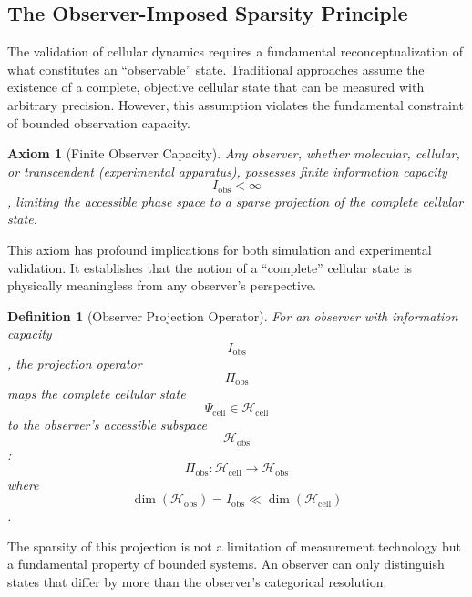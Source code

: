 \documentclass[11pt,twocolumn,a4paper]{article}
\newtheorem{definition}[theorem]{Definition}
\newtheorem{axiom}[theorem]{Axiom}
\theoremstyle{remark}
\begin{document}
\subsection{The Observer-Imposed Sparsity Principle}

The validation of cellular dynamics requires a fundamental reconceptualization of what constitutes an ``observable'' state. Traditional approaches assume the existence of a complete, objective cellular state that can be measured with arbitrary precision. However, this assumption violates the fundamental constraint of bounded observation capacity.

\begin{axiom}[Finite Observer Capacity]
\label{ax:finite_observer}
Any observer, whether molecular, cellular, or transcendent (experimental apparatus), possesses finite information capacity $$I_{\mathrm{obs}} < \infty$$, limiting the accessible phase space to a sparse projection of the complete cellular state.
\end{axiom}

This axiom has profound implications for both simulation and experimental validation. It establishes that the notion of a ``complete'' cellular state is physically meaningless from any observer's perspective.

\begin{definition}[Observer Projection Operator]
\label{def:observer_projection}
For an observer with information capacity $$I_{\mathrm{obs}}$$, the projection operator $$\Pi_{\mathrm{obs}}$$ maps the complete cellular state $$\Psi_{\mathrm{cell}} \in \mathcal{H}_{\mathrm{cell}}$$ to the observer's accessible subspace $$\mathcal{H}_{\mathrm{obs}}$$:
$$
\Pi_{\mathrm{obs}}: \mathcal{H}_{\mathrm{cell}} \to \mathcal{H}_{\mathrm{obs}}
$$
where $$\dim(\mathcal{H}_{\mathrm{obs}}) = I_{\mathrm{obs}} \ll \dim(\mathcal{H}_{\mathrm{cell}})$$.
\end{definition}

The sparsity of this projection is not a limitation of measurement technology but a fundamental property of bounded systems. An observer can only distinguish states that differ by more than the observer's categorical resolution.
\end{document}
